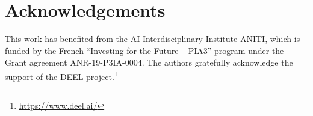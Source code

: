 \documentclass[nohyperref]{article}
\theoremstyle{plain}
\begin{document}
\printAffiliationsAndNotice{\icmlEqualContribution } %








\section{Acknowledgements}
This work has benefited from the AI Interdisciplinary Institute ANITI, which is funded by the French ``Investing for the Future – PIA3'' program under the Grant agreement ANR-19-P3IA-0004. The authors gratefully acknowledge the support of the DEEL project.\footnote{\url{https://www.deel.ai/}}  

{\small


}

\newpage
\onecolumn

\end{document}
